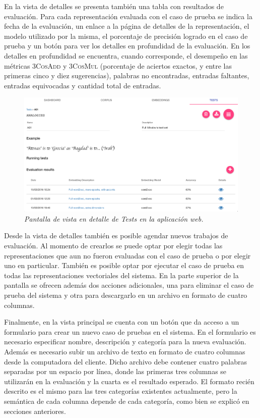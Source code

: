 En la vista de detalles se presenta también una tabla con resultados de evaluación. Para cada representación
evaluada con el caso de prueba se indica la fecha de la evaluación, un enlace a la página de detalles de la
representación, el modelo utilizado por la misma, el porcentaje de precisión logrado en el caso de prueba y
un botón para ver los detalles en profundidad de la evaluación. En los detalles en profundidad se
encuentra, cuando corresponde, el desempeño en las métricas \textsc{3CosAdd} y \textsc{3CosMul}
(porcentaje de aciertos exactos, y entre las primeras cinco y diez sugerencias), palabras no encontradas,
entradas faltantes, entradas equivocadas y cantidad total de entradas.

\begin{figure}[h]
    \centering
    \includegraphics[width=\textwidth]{images/ui-nabu-tests-detail}
    \caption{\textit{Pantalla de vista en detalle de Tests en la aplicación web.}}
    \label{fig:ui-nabu-tests-detail}
\end{figure}

Desde la vista de detalles también es posible agendar nuevos trabajos de evaluación. Al momento de
crearlos se puede optar por elegir todas las representaciones que aun no fueron evaluadas con el caso de
prueba o por elegir uno en particular. También es posible optar por ejecutar el caso de prueba en todas las
representaciones vectoriales del sistema. En la parte superior de la pantalla se ofrecen además dos acciones
adicionales, una para eliminar el caso de prueba del sistema y otra para descargarlo en un archivo en formato
de cuatro columnas.

Finalmente, en la vista principal se cuenta con un botón que da acceso a un formulario para crear un
nuevo caso de pruebas en el sistema. En el formulario es necesario especificar nombre, descripción y
categoría para la nueva evaluación. Además es necesario subir un archivo de texto en formato de cuatro
columnas desde la computadora del cliente. Dicho archivo debe contener cuatro palabras separadas por un
espacio por línea, donde las primeras tres columnas se utilizarán en la evaluación y la cuarta es el
resultado esperado. El formato recién descrito es el mismo para las tres categorías existentes
actualmente, pero la semántica de cada columna depende de cada categoría, como bien se explicó en
secciones anteriores.


